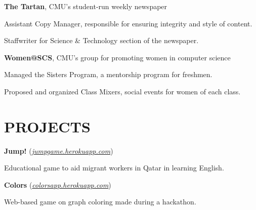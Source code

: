 \documentclass[margin, 11pt]{res} %
\begin{document}
\begin{resume}
{\bf The Tartan}, CMU's student-run weekly newspaper

\begin{itemize} \itemsep -2pt
{\small \item Assistant Copy Manager, responsible for ensuring integrity and style of content.
\item Staffwriter for Science \& Technology section of the newspaper.}
\end{itemize}

\vspace{3pt}

{\bf Women@SCS}, CMU's group for promoting women in computer science

\begin{itemize} \itemsep -2pt
{\small \item Managed the Sisters Program, a mentorship program for freshmen.
\item Proposed and organized Class Mixers, social events for women of each class.}
\end{itemize}



\section{PROJECTS}

{\bf Jump!} {\small (\href{http://jumpgame.herokuapp.com/}{\sl jumpgame.herokuapp.com}) }

\begin{itemize} \itemsep -2pt
{\small \item Educational game to aid migrant workers in Qatar in learning English.}
\end{itemize}

\vspace{3pt}

{\bf Colors} {\small (\href{http://colorsapp.herokuapp.com}{\sl colorsapp.herokuapp.com})}
\begin{itemize} \itemsep -2pt
{\small \item Web-based game on graph coloring made during a hackathon.}
\end{itemize}


\end{resume}
\end{document}

